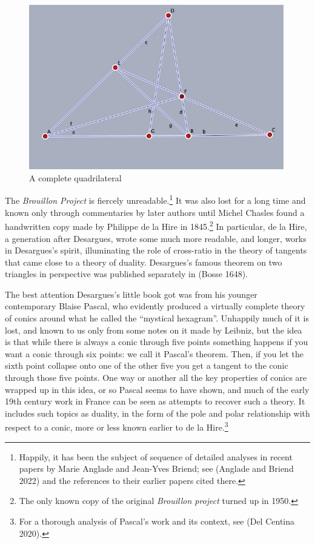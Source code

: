 \documentclass[11pt]{article}
\begin{document}
\bigskip
\begin{center}
    \begin{figure}
   \begin{center}  \includegraphics[width=30em]{CompleteQuad3.png} 
   \end{center}
     \protect \caption{A complete quadrilateral}
      \label{figCompleteQuad}
     \end{figure}
\end{center}

\bigskip 





The  \emph{Brouillon Project} is fiercely unreadable.\footnote{Happily, it has been the subject of sequence of detailed analyses in recent papers by Marie  Anglade and Jean-Yves Briend; see (Anglade and Briend 2022) and the references to their earlier papers cited there.} It was also lost for a long time and known only through commentaries by later authors until Michel Chasles found a handwritten copy made by Philippe de la Hire in 1845.\footnote{The only known copy of the original \emph{Brouillon project} turned up in 1950.} In particular, de la Hire, a generation after Desargues, wrote some much more readable, and longer, works in Desargues's spirit, illuminating the role of cross-ratio in the theory of tangents that came close to a theory of duality. Desargues's famous theorem on two triangles in perspective was published separately in (Bosse 1648).

The best attention Desargues's little book got was from his younger contemporary Blaise Pascal, who evidently produced a virtually complete theory of conics around what he called the ``mystical hexagram''. Unhappily much of it is lost, and known to us only from some notes on it made by Leibniz, but the idea is that while there is always a conic through five points something happens if you want a conic through six points: we call it Pascal's theorem. Then, if you let the sixth point collapse onto one of the other five you get a tangent to the conic through those five points. One way or another all the key properties of conics are wrapped up in this idea, or so Pascal seems to have shown, and much of the early 19th century work in France can be seen as attempts to recover such a theory. It includes such topics as duality, in the form of the pole and polar relationship with respect to a conic, more or less known earlier to de la Hire.\footnote{For a thorough analysis of Pascal's work and its context, see (Del Centina 2020).} 
\end{document}
